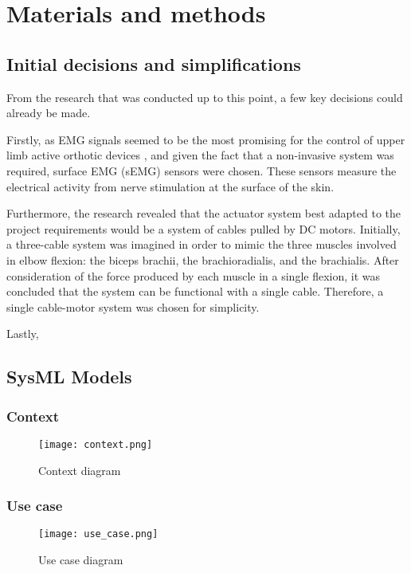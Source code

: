 \chapter{Materials and methods}

\section{Initial decisions and simplifications}
From the research that was conducted up to this point, a few key decisions 
could already be made.  

Firstly, as EMG signals seemed to be the most promising for the control of upper 
limb active orthotic devices \cite{dos_santos_signals_2023}, and given the fact 
that a non-invasive system was required, surface EMG (sEMG) sensors were chosen. 
These sensors measure the electrical activity from nerve stimulation at the 
surface of the skin.  

Furthermore, the research revealed that the actuator system best adapted to the 
project requirements would be a system of cables pulled by DC motors. Initially, 
a three-cable system was imagined in order to mimic the three muscles involved 
in elbow flexion: the biceps brachii, the brachioradialis, and the brachialis. 
After consideration of the force produced by each muscle in a single flexion, 
it was concluded that the system can be functional with a single cable. 
Therefore, a single cable-motor system was chosen for simplicity.  

Lastly, 

\section{SysML Models}
\subsection{Context}
\begin{figure}[htbp]
  \centering
  \texttt{[image: context.png]}
  \caption{Context diagram}
  \label{fig:context_diagram}
\end{figure}
\FloatBarrier
\subsection{Use case}
\begin{figure}[htbp]
  \centering
  \texttt{[image: use\_case.png]}
  \caption{Use case diagram}
  \label{fig:use_case_diagram}
\end{figure}
\FloatBarrier
